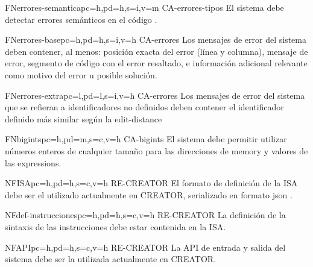 \begin{softwareReq}{FN}{errores-semantica}{pc=h,pd=h,s=i,v=m}
    {CA-errores-tipos}
    El sistema debe detectar errores semánticos en el código .
\end{softwareReq}

\begin{softwareReq}{FN}{errores-base}{pc=h,pd=h,s=i,v=h}
    {CA-errores}
    Los mensajes de error del sistema deben contener, al menos: posición exacta
    del error (línea y columna), mensaje de error, segmento de código con el
    error resaltado, e información adicional relevante como motivo del error u
    posible solución.
\end{softwareReq}

\begin{softwareReq}{FN}{errores-extra}{pc=l,pd=l,s=i,v=h}
   {CA-errores}
   Los mensajes de error del sistema que se refieran a identificadores no
   definidos deben contener el identificador definido más similar según la
   \gls{edit-distance}
\end{softwareReq}

\begin{softwareReq}{FN}{bigints}{pc=h,pd=m,s=c,v=h}
    {CA-bigints}
    El sistema debe permitir utilizar números enteros de cualquier tamaño para
    las direcciones de \gls{memory} y valores de las \glspl{expression}.
\end{softwareReq}


\begin{softwareReq}{NF}{ISA}{pc=h,pd=h,s=c,v=h}
    {RE-CREATOR}
    El formato de definición de la \gls{ISA} debe ser el utilizado
    actualmente en CREATOR, serializado en formato \gls{json}
    \parencite{JSONStandard}. %
\end{softwareReq}

\begin{softwareReq}{NF}{def-instrucciones}{pc=h,pd=h,s=c,v=h}
    {RE-CREATOR}
    La definición de la sintaxis de las instrucciones debe estar contenida en la
    \gls{ISA}.
\end{softwareReq}

\begin{softwareReq}{NF}{API}{pc=h,pd=h,s=c,v=h}
    {RE-CREATOR}
    La \gls{API} de entrada y salida del sistema debe ser la utilizada
    actualmente en CREATOR.
\end{softwareReq}

